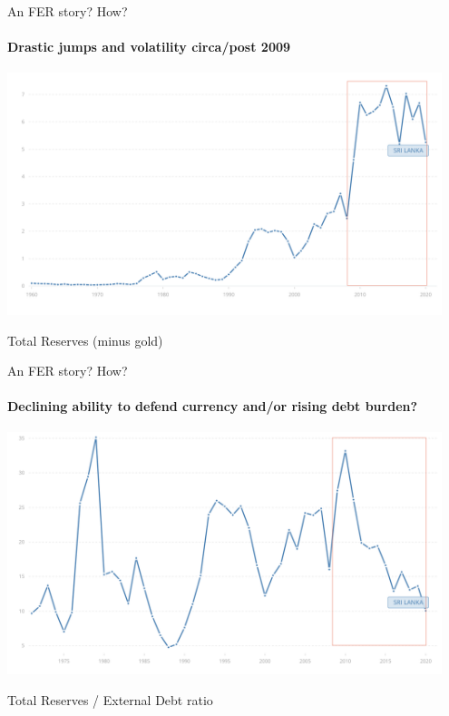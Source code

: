\documentclass[10pt,english,slidetop,compress,
              blue,mathserif,color=option]{beamer}
\theoremstyle{plain}
\theoremstyle{definition}
\begin{document}
\begin{frame}{An FER story? How?}
  \framesubtitle{Drastic jumps and volatility circa/post 2009}
  \includegraphics[width=0.95\textwidth]{figures/total-reserves-exgold.png}
  \begin{center}
    Total Reserves (minus gold)
  \end{center}
\end{frame}

\begin{frame}{An FER story? How?}
  \framesubtitle{
    Declining ability to defend currency and/or rising debt burden?
    }
  \includegraphics[width=0.95\textwidth]{figures/total-reserves-to-external-debt.png}
    \begin{center}
      Total Reserves / External Debt ratio
    \end{center}
\end{frame}
\end{document}
